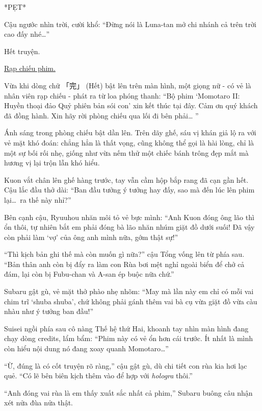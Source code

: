 \documentclass[../main.tex]{subfiles}
\begin{document}
*PẸT*

Cậu ngước nhìn trời, cười khổ: ``Đừng nói là Luna-tan mở chi nhánh cả trên trời cao đấy nhé\dots''

Hết truyện.


\omk

\begin{center}
    \uline{Rạp chiếu phim.}
\end{center}

Vừa khi dòng chữ 「完」 (Hết) bật lên trên màn hình, một giọng nữ - có vẻ là nhân viên rạp chiếu - phát ra từ loa phóng thanh: ``Bộ phim `Momotaro II: Huyền thoại đảo Quỷ phiên bản sói con' xin kết thúc tại đây. Cảm ơn quý khách đã đồng hành. Xin hãy rời phòng chiếu qua lối đi bên phải\dots
''

Ánh sáng trong phòng chiếu bật dần lên. Trên dãy ghế, sáu vị khán giả lộ ra với vẻ mặt khó đoán: chẳng hẳn là thất vọng, cũng không thể gọi là hài lòng, chỉ là một sự bối rối nhẹ, giống như vừa nếm thử một chiếc bánh trông đẹp mắt mà hương vị lại trộn lẫn khó hiểu.

Kuon vắt chân lên ghế hàng trước, tay vẫn cầm hộp bắp rang đã cạn gần hết. Cậu lắc đầu thở dài: ``Ban đầu tưởng ý tưởng hay đấy, sao mà đến lúc lên phim lại\dots\ ra thế này nhỉ?''

Bên cạnh cậu, Ryuuhou nhăn môi tỏ vẻ bực mình: ``Anh Kuon đóng ông lão thì ổn thôi, tự nhiên bắt em phải đóng bà lão nhăn nhúm giặt đồ dưới suối! Đã vậy còn phải làm `vợ' của ông anh mình nữa, gớm thật sự!''

``Thì kịch bản ghi thế mà còn muốn gì nữa?'' cậu Tổng vống lên từ phía sau. ``Bản thân anh còn bị đẩy ra làm con Rùa bơi mệt nghỉ ngoài biển để chở cả đám, lại còn bị Fubu-chan và A-san ép buộc nữa chứ.''

Subaru gật gù, vẻ mặt thở phào nhẹ nhõm: ``May mà lần này em chỉ có mỗi vai chim trĩ `shuba shuba', chứ không phải gánh thêm vai bà cụ vừa giặt đồ vừa càu nhàu như ý tưởng ban đầu!''

Suisei ngồi phía sau cô nàng Thế hệ thứ Hai, khoanh tay nhìn màn hình đang chạy dòng credits, lẩm bẩm: ``Phim này có vẻ ổn hơn cái trước. Ít nhất là mình còn hiểu nội dung nó đang xoay quanh Momotaro\dots''

``Ừ, đúng là có cốt truyện rõ ràng,'' cậu gật gù, dù chi tiết con rùa kia hơi lạc quẻ. ``Có lẽ bên biên kịch thêm vào để hợp với \textit{hologra} thôi.''

``Anh đóng vai rùa là em thấy xuất sắc nhất cả phim,'' Subaru buông câu nhận xét nửa đùa nửa thật.
\end{document}
